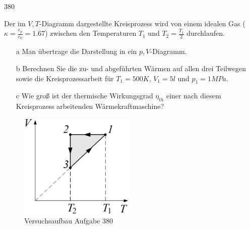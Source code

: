 \begin{auf}
    380
\end{auf}
Der im $V,T$-Diagramm dargestellte Kreisprozess wird von einem idealen Gas ($\kappa=\frac{c_p}{c_V}=1.67$) zwischen den Temperaturen $T_1$ und $T_2=\frac{T_1}{2}$ durchlaufen.
\begin{enumerate}
    \item[a] Man übertrage die Darstellung in ein $p,V$-Diagramm.
    \item[b] Berechnen Sie die zu- und abgeführten Wärmen auf allen drei Teilwegen sowie die Kreisprozessarbeit für $T_1=500K$, $V_1=5l$ und $p_1=1MPa$.
    \item[c] Wie groß ist der thermische Wirkungsgrad $\eta_{th}$ einer nach diesem Kreisprozess arbeitenden Wärmekraftmaschine?
\end{enumerate}
\begin{figure}[h]
    \centering
    \includegraphics[height=5cm]{images/380_0.png}
    \caption{Versuchsaufbau Aufgabe 380}
\end{figure}